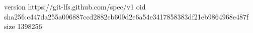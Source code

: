 version https://git-lfs.github.com/spec/v1
oid sha256:c447da255a096887ccd2882cb609d2e6a54e3417858383df21eb9864968e487f
size 1398256
